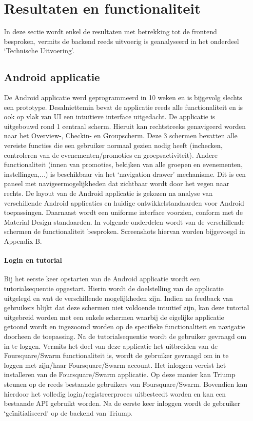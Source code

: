
\chapter{Resultaten en functionaliteit}
In deze sectie wordt enkel de resultaten met betrekking tot de frontend besproken, vermits de backend reeds uitvoerig is geanalyseerd in het onderdeel `Technische Uitvoering'.
\section{Android applicatie}
De Android applicatie werd geprogrammeerd in 10 weken en is bijgevolg slechts een prototype. Desalniettemin bevat de applicatie reeds alle functionaliteit en is ook op vlak van UI een intuïtieve interface uitgedacht.
De applicatie is uitgebouwd rond 1 centraal scherm. Hieruit kan rechtstreeks genavigeerd worden naar het Overview-, Checkin- en Groupscherm. Deze 3 schermen bevatten alle vereiste functies die een gebruiker normaal gezien nodig heeft (inchecken, controleren van de evenementen/promoties en groepsactiviteit). Andere functionaliteit (innen van promoties, bekijken van alle groepen en evenementen, instellingen,...) is beschikbaar via het `navigation drawer' mechanisme. Dit is een paneel met navigeermogelijkheden dat zichtbaar wordt door het vegen naar rechts. De layout van de Android applicatie is gekozen na analyse van verschillende Android applicaties en huidige ontwikkelstandaarden voor Android toepassingen. Daarnaast wordt een uniforme interface voorzien, conform met de Material Design standaarden. In volgende onderdelen wordt van de verschillende schermen de functionaliteit besproken. Screenshots hiervan worden bijgevoegd in Appendix B.
\subsubsection{Login en tutorial} %
Bij het eerste keer opstarten van de Android applicatie wordt een tutorialsequentie opgestart. Hierin wordt de doelstelling van de applicatie uitgelegd en wat de verschillende mogelijkheden zijn. Indien na feedback van gebruikers blijkt dat deze schermen niet voldoende intuïtief zijn, kan deze tutorial uitgebreid worden met een enkele schermen waarbij de eigelijke applicatie getoond wordt en ingezoomd worden op de specifieke functionaliteit en navigatie doorheen de toepassing. 
Na de tutorialsequentie wordt de gebruiker gevraagd om in te loggen. Vermits het doel van deze applicatie het uitbreiden van de Foursquare/Swarm functionaliteit is, wordt de gebruiker gevraagd om in te loggen met zijn/haar Foursquare/Swarm account. Het inloggen vereist het installeren van de Foursquare/Swarm applicatie. Op deze manier kan Triump steunen op de reeds bestaande gebruikers van Foursquare/Swarm. Bovendien kan hierdoor het volledig login/registreerproces uitbesteedt worden en kan een bestaande API gebruikt worden.
Na de eerste keer inloggen wordt de gebruiker `geïnitialiseerd' op de backend van Triump.
